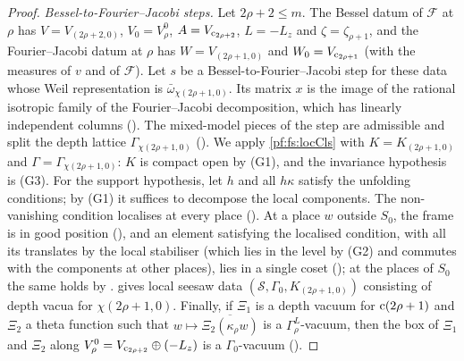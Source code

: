 \begin{proof}
\emph{Bessel-to-Fourier--Jacobi steps.} Let $2\rho+2\le m$. The Bessel datum of $\mathcal F$ at $\rho$ has $V=V_{(2\rho+2,0)}$, $V_0=V^0_\rho$,
$A=V_{\mathrm{c}_{2\rho+2}}$, $L=-L_z$ and $\zeta=\zeta_{\rho+1}$, and the Fourier--Jacobi datum at $\rho$ has $W=V_{(2\rho+1,0)}$ and
$W_0=V_{\mathrm{c}_{2\rho+1}}$ (with the measures of $v$ and of $\mathcal F$). Let $s$ be a Bessel-to-Fourier--Jacobi step for these data whose Weil
representation is $\bar\omega_{\chi(2\rho+1,0)}$. Its matrix $x$ is the image of the rational
isotropic family of the Fourier--Jacobi decomposition, which has linearly independent columns (). The
mixed-model pieces of the step are admissible and split the depth lattice $\Gamma_{\chi(2\rho+1,0)}$
(). We apply \cref{pf:fs:locCls} with $K=K_{(2\rho+1,0)}$ and
$\Gamma=\Gamma_{\chi(2\rho+1,0)}$: $K$ is compact open by (G1), and the invariance hypothesis is (G3). For the support hypothesis, let
$h$ and all $h\kappa$ satisfy the unfolding conditions; by (G1) it suffices to decompose the local components. The non-vanishing condition
localises at every place (). At a place $w$ outside $S_0$, the frame is in good
position (), and an element satisfying the localised condition, with
all its translates by the local stabiliser (which lies in the level by (G2) and commutes with the components at other places), lies in a
single coset (); at the places of $S_0$ the same holds by
.  gives local seesaw data
$(\mathcal S,\Gamma_0,K_{(2\rho+1,0)})$ consisting of depth vacua for $\chi(2\rho+1,0)$. Finally, if $\Xi_1$ is a depth vacuum for $\mathrm{c}(2\rho+1)$ and
$\Xi_2$ a theta function such that $w\mapsto\overline{\Xi_2(\kappa_\rho w)}$ is a $\Gamma^L_\rho$-vacuum, then the box of $\Xi_1$ and $\Xi_2$ along
$V^0_\rho=V_{\mathrm{c}_{2\rho+2}}\oplus(-L_z)$ is a $\Gamma_0$-vacuum ().


\end{proof}
